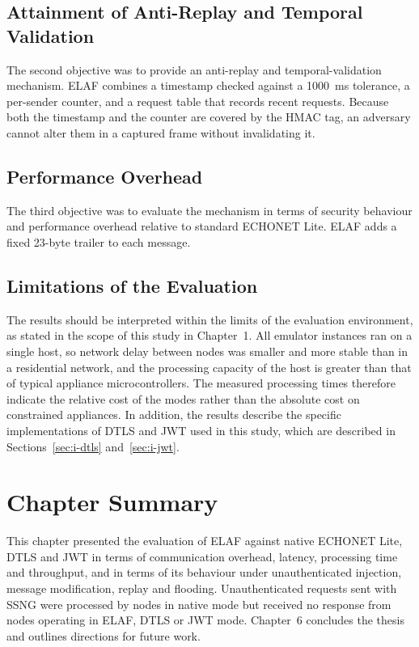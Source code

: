 \subsection{Attainment of Anti-Replay and Temporal Validation}

The second objective was to provide an anti-replay and temporal-validation mechanism. ELAF combines a timestamp checked against a 1000~ms tolerance, a per-sender counter, and a request table that records recent requests. Because both the timestamp and the counter are covered by the HMAC tag, an adversary cannot alter them in a captured frame without invalidating it.

\subsection{Performance Overhead}

The third objective was to evaluate the mechanism in terms of security behaviour and performance overhead relative to standard ECHONET Lite. ELAF adds a fixed 23-byte trailer to each message.

\subsection{Limitations of the Evaluation}

The results should be interpreted within the limits of the evaluation environment, as stated in the scope of this study in Chapter~1. All emulator instances ran on a single host, so network delay between nodes was smaller and more stable than in a residential network, and the processing capacity of the host is greater than that of typical appliance microcontrollers. The measured processing times therefore indicate the relative cost of the modes rather than the absolute cost on constrained appliances. In addition, the results describe the specific implementations of DTLS and JWT used in this study, which are described in Sections~\ref{sec:i-dtls} and~\ref{sec:i-jwt}.

\section{Chapter Summary}
\label{sec:r-summary}

This chapter presented the evaluation of ELAF against native ECHONET Lite, DTLS and JWT in terms of communication overhead, latency, processing time and throughput, and in terms of its behaviour under unauthenticated injection, message modification, replay and flooding. Unauthenticated requests sent with SSNG were processed by nodes in native mode but received no response from nodes operating in ELAF, DTLS or JWT mode.
Chapter~6 concludes the thesis and outlines directions for future work.
